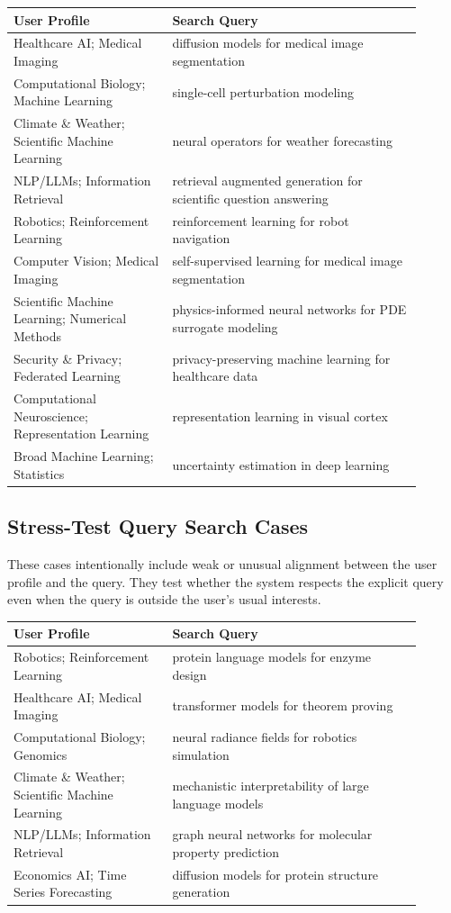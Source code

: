 \documentclass[11pt]{article}
\begin{document}
\begin{longtable}{p{0.35\linewidth} p{0.55\linewidth}}
\toprule
\textbf{User Profile} & \textbf{Search Query} \\
\midrule
Healthcare AI; Medical Imaging & diffusion models for medical image segmentation \\
Computational Biology; Machine Learning & single-cell perturbation modeling \\
Climate \& Weather; Scientific Machine Learning & neural operators for weather forecasting \\
NLP/LLMs; Information Retrieval & retrieval augmented generation for scientific question answering \\
Robotics; Reinforcement Learning & reinforcement learning for robot navigation \\
Computer Vision; Medical Imaging & self-supervised learning for medical image segmentation \\
Scientific Machine Learning; Numerical Methods & physics-informed neural networks for PDE surrogate modeling \\
Security \& Privacy; Federated Learning & privacy-preserving machine learning for healthcare data \\
Computational Neuroscience; Representation Learning & representation learning in visual cortex \\
Broad Machine Learning; Statistics & uncertainty estimation in deep learning \\
\bottomrule
\end{longtable}

\subsection{Stress-Test Query Search Cases}

These cases intentionally include weak or unusual alignment between the user profile and the query. They test whether the system respects the explicit query even when the query is outside the user's usual interests.

\begin{longtable}{p{0.35\linewidth} p{0.55\linewidth}}
\toprule
\textbf{User Profile} & \textbf{Search Query} \\
\midrule
Robotics; Reinforcement Learning & protein language models for enzyme design \\
Healthcare AI; Medical Imaging & transformer models for theorem proving \\
Computational Biology; Genomics & neural radiance fields for robotics simulation \\
Climate \& Weather; Scientific Machine Learning & mechanistic interpretability of large language models \\
NLP/LLMs; Information Retrieval & graph neural networks for molecular property prediction \\
Economics AI; Time Series Forecasting & diffusion models for protein structure generation \\
\bottomrule
\end{longtable}
\end{document}
